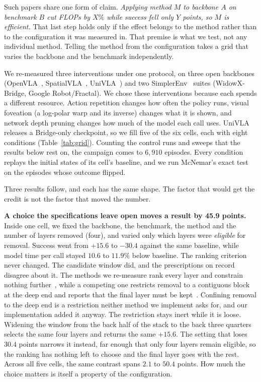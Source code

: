 Such papers share one form of claim. \emph{Applying method $M$ to backbone $A$
on benchmark $B$ cut FLOPs by $X\%$ while success fell only $Y$ points, so $M$
is efficient.} That last step holds only if the effect belongs to the method
rather than to the configuration it was measured in. That premise is what we
test, not any individual method. Telling the method from the configuration
takes a grid that varies the backbone and the benchmark independently.

We re-measured three interventions under one protocol, on three open backbones
(OpenVLA~\cite{openvla}, SpatialVLA~\cite{spatialvla}, UniVLA~\cite{univla})
and two SimplerEnv~\cite{simplerenv} suites (WidowX-Bridge, Google
Robot/Fractal). We chose these interventions because each spends a different
resource. Action repetition changes how often the policy runs, visual
foveation (a log-polar warp and its inverse) changes what it is shown, and
network depth pruning changes how much of the model each call uses. UniVLA
releases a Bridge-only checkpoint, so we fill five of the six cells, each with
eight conditions (Table~\ref{tab:grid}). Counting the control runs and sweeps
that the results below rest on, the campaign comes to $6{,}910$ episodes.
Every condition replays the initial states of its cell's baseline, and we run
McNemar's exact test on the episodes whose outcome flipped.

Three results follow, and each has the same shape. The factor that would get
the credit is not the factor that moved the number.

\textbf{A choice the specifications leave open moves a result by 45.9 points.}
Inside one cell, we fixed the backbone, the benchmark, the method and the
number of layers removed (four), and varied only which layers were
\emph{eligible} for removal. Success went from $+15.6$ to $-30.4$ against the
same baseline, while model time per call stayed $10.6$ to $11.9\%$ below
baseline. The ranking criterion never changed. The candidate window did, and
the prescriptions on record disagree about it. The methods we re-measure rank
every layer and constrain nothing further~\cite{shortgpt, efficientvla}, while
a competing one restricts removal to a contiguous block at the deep end and
reports that the final layer must be kept~\cite{gromov}. Confining removal to
the deep end is a restriction neither method we implement asks for, and our
implementation added it anyway. The restriction stays inert while it is loose.
Widening the window from the back half of the stack to the back three quarters
selects the same four layers and returns the same $+15.6$. The setting that
loses $30.4$ points narrows it instead, far enough that only four layers
remain eligible, so the ranking has nothing left to choose and the final layer
goes with the rest. Across all five cells, the same contrast spans $2.1$ to
$50.4$ points. How much the choice matters is itself a property of the
configuration.

